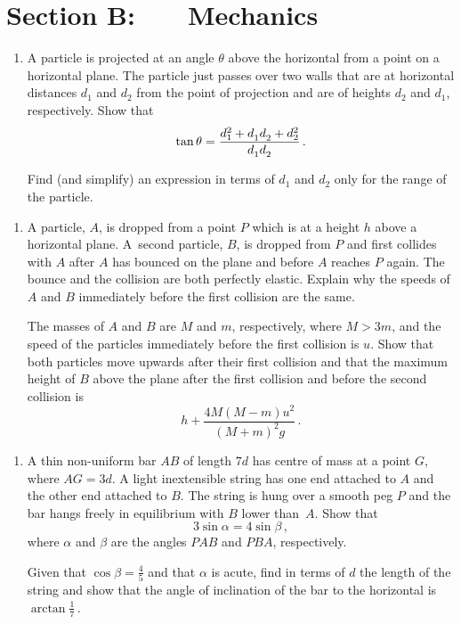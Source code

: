 \documentclass[a4, 11pt]{report}
\newlength{\qspace}
\newcounter{qnumber}
\newenvironment{question}%
 {\vspace{\qspace}
  \begin{enumerate}[\bfseries 1\quad][10]%
    \setcounter{enumi}{\value{qnumber}}%
    \item%
 }
{
  \end{enumerate}
  \filbreak
  \stepcounter{qnumber}
 }
\newcommand{\subone}{ {\vphantom{\dot A}1}}
\newcommand{\subtwo}{ {\vphantom{\dot A}2}}
\begin{document}
		
	
\newpage
\section*{Section B: \ \ \ Mechanics}


	
\begin{question}
A particle is projected at an angle $\theta$ above the horizontal
from a point on a horizontal plane. The particle
just passes over two walls that are
 at horizontal distances $d_1$ and $d_2$ from the point
of projection  and are of heights $d_2$ and $d_1$, respectively.
Show that
\[
\tan\theta = \frac{d_1^2+d_\subone d_\subtwo +d_2^2}{d_\subone d_\subtwo}\,.
\]

Find (and simplify)
an  expression 
 in terms of $d_1$ and $d_2$ only 
for the range of the particle.
	\end{question}
	
\begin{question}	
A particle, $A$, is dropped from a point $P$ which is
at a height $h$ above a horizontal 
plane. 
A~second particle, $B$, is dropped from $P$ and first collides
with $A$ after $A$ has bounced on the plane and before $A$
reaches $P$ again. The bounce and the collision  are both
perfectly elastic. Explain why the speeds of $A$ and $B$ immediately
before the first collision are the same.

The masses of $A$ and $B$ are $M$ and $m$, respectively, where $M>3m$,
and the speed of the particles immediately before
the first collision is $u$. 
Show that both particles move upwards after their 
first collision and that the maximum height of $B$ above the 
plane after the first collision
 and before the second  collision is 
\[
 h+ \frac{4M(M-m)u^2}{(M+m)^2g}\,.
\]
\end{question}


\begin{question}
A thin non-uniform bar $AB$ of length $7d$
 has centre of mass 
at a point $G$, where $AG=3d$.
A light inextensible string has one end attached to $A$ and
the other end attached to $B$. The string is hung over a smooth
peg $P$ and the bar hangs freely in equilibrium  with $B$ lower than~$A$.
Show that 
\[
3\sin\alpha = 4\sin\beta\,,
\]
where $\alpha$ and $\beta$ are the angles $PAB$ and $PBA$, respectively.

Given that $\cos\beta=\frac45$ and that $\alpha$ is acute, 
find in terms of $d$
the length of the string and
show that the angle of inclination of the bar to the horizontal
is $\arctan \frac17\,$.
\end{question}
	
\end{document}
